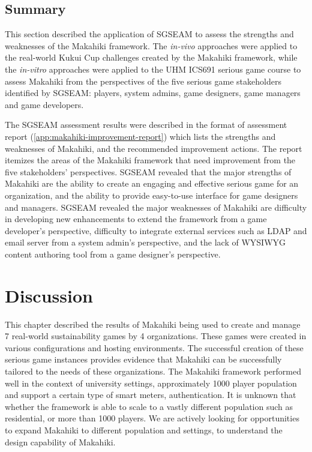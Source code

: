 \subsection{Summary}

This section described the application of SGSEAM to assess the strengths and weaknesses of the Makahiki framework. The {\em in-vivo} approaches were applied to the real-world Kukui Cup challenges created by the Makahiki framework, while the {\em in-vitro} approaches were applied to the UHM ICS691 serious game course to assess Makahiki from the perspectives of the five serious game stakeholders identified by SGSEAM: players, system admins, game designers, game managers and game developers.

The SGSEAM assessment results were described in the format of assessment report (\autoref{app:makahiki-improvement-report}) which lists the strengths and weaknesses of Makahiki, and the recommended improvement actions. The report itemizes the areas of the Makahiki framework that need improvement from the five stakeholders' perspectives. SGSEAM revealed that the major strengths of Makahiki are the ability to create an engaging and effective serious game for an organization, and the ability to provide easy-to-use interface for game designers and managers. SGSEAM revealed the major weaknesses of Makahiki are difficulty in developing new enhancements to extend the framework from a game developer's perspective, difficulty to integrate external services such as LDAP and email server from a system admin's perspective, and the lack of WYSIWYG content authoring tool from a game designer's perspective.

\section{Discussion}

This chapter described the results of Makahiki being used to create and manage 7 real-world sustainability games by 4 organizations. These games were created in various configurations and hosting environments. The successful creation of these serious game instances provides evidence that Makahiki can be successfully tailored to the needs of these organizations. The Makahiki framework performed well in the context of university settings, approximately 1000 player population and support a certain type of smart meters, authentication. It is unknown that whether the framework is able to scale to a vastly different population such as residential, or more than 1000 players. We are actively looking for opportunities to expand Makahiki to different population and settings, to understand the design capability of Makahiki.

